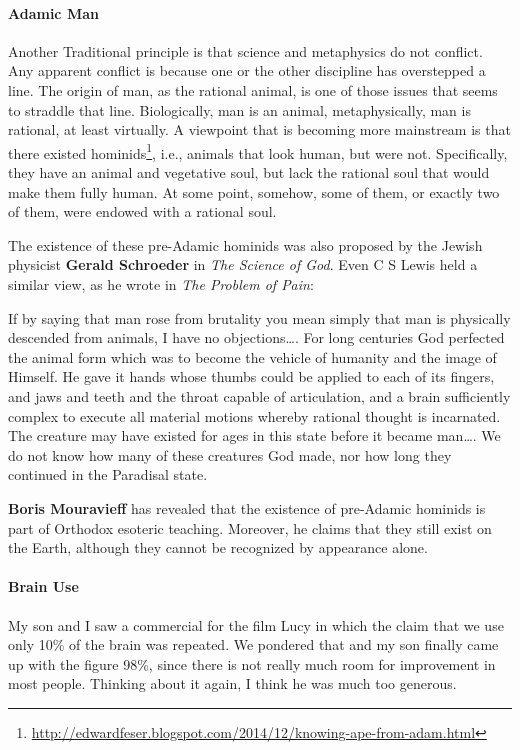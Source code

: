\paragraph{Adamic Man}
Another Traditional principle is that science and metaphysics do not conflict. Any apparent conflict is because one or the other discipline has overstepped a line. The origin of man, as the rational animal, is one of those issues that seems to straddle that line. Biologically, man is an animal, metaphysically, man is rational, at least virtually. A viewpoint that is becoming more mainstream is that there existed hominids\footnote{\url{http://edwardfeser.blogspot.com/2014/12/knowing-ape-from-adam.html}}, i.e., animals that look human, but were not. Specifically, they have an animal and vegetative soul, but lack the rational soul that would make them fully human. At some point, somehow, some of them, or exactly two of them, were endowed with a rational soul.

The existence of these pre-Adamic hominids was also proposed by the Jewish physicist \textbf{Gerald Schroeder} in \emph{The Science of God}. Even C S Lewis held a similar view, as he wrote in \emph{The Problem of Pain}:

\begin{quotex}
If by saying that man rose from brutality you mean simply that man is physically descended from animals, I have no objections…. For long centuries God perfected the animal form which was to become the vehicle of humanity and the image of Himself. He gave it hands whose thumbs could be applied to each of its fingers, and jaws and teeth and the throat capable of articulation, and a brain sufficiently complex to execute all material motions whereby rational thought is incarnated. The creature may have existed for ages in this state before it became man…. We do not know how many of these creatures God made, nor how long they continued in the Paradisal state. 

\end{quotex}
\textbf{Boris Mouravieff} has revealed that the existence of pre-Adamic hominids is part of Orthodox esoteric teaching. Moreover, he claims that they still exist on the Earth, although they cannot be recognized by appearance alone.

\paragraph{Brain Use}
My son and I saw a commercial for the film Lucy in which the claim that we use only 10\% of the brain was repeated. We pondered that and my son finally came up with the figure 98\%, since there is not really much room for improvement in most people. Thinking about it again, I think he was much too generous.

